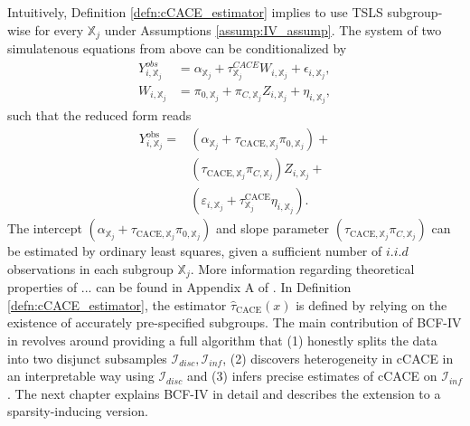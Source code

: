 Intuitively, Definition \ref{defn:cCACE_estimator} implies to use TSLS subgroup-wise for every $\mathbb{X}_j$ under Assumptions \ref{assump:IV_assump}. The system of two simulatenous equations from above can be conditionalized by 
\begin{align*}
   Y_{i, \mathbb{X}_j}^{obs} &= \alpha_{\mathbb{X}_j} + \tau_{\mathbb{X}_j}^{CACE} W_{i, \mathbb{X}_j} + \epsilon_{i, \mathbb{X}_j}, \\
   W_{i, \mathbb{X}_j} &= \pi_{0, \mathbb{X}_j} + \pi_{C, \mathbb{X}_j} Z_{i, \mathbb{X}_j} + \eta_{i, \mathbb{X}_j},
\end{align*}
such that the reduced form reads 
\begin{align*}
   Y_{i,\mathbb{X}_j}^{\text{obs}} = &\left( \alpha_{\mathbb{X}_j} +
    \tau_{\text{CACE},\mathbb{X}_j} \pi_{0,\mathbb{X}_j} \right) + \\
     &\left( \tau_{\text{CACE},\mathbb{X}_j} \pi_{C,\mathbb{X}_j} \right) Z_{i,\mathbb{X}_j} + \\
     &\left( \varepsilon_{i,\mathbb{X}_j} + \tau^{\text{CACE}}_{\mathbb{X}_j} \eta_{i,\mathbb{X}_j} \right).
\end{align*}
The intercept $\left( \alpha_{\mathbb{X}_j} + \tau_{\text{CACE},\mathbb{X}_j} \pi_{0,\mathbb{X}_j} \right)$ and slope parameter $\left( \tau_{\text{CACE},\mathbb{X}_j} \pi_{C,\mathbb{X}_j} \right)$ can be estimated by ordinary least squares, given a sufficient number of $i.i.d$ observations in each subgroup $\mathbb{X}_j$. More information regarding theoretical properties of ... can be found in Appendix A of \cite{bargagli-stoffi_heterogeneous_2022}. In Definition \ref{defn:cCACE_estimator}, the estimator $\widehat\tau_{\text{CACE}}(x)$ is defined by relying on the existence of accurately pre-specified subgroups. The main contribution of BCF-IV in \cite{bargagli-stoffi_heterogeneous_2022} revolves around providing a full algorithm that (1) honestly splits the data into two disjunct subsamples $\mathcal{I}_{disc}, \mathcal{I}_{inf}$, (2) discovers heterogeneity in cCACE in an interpretable way using $\mathcal{I}_{disc}$ and (3) infers precise estimates of cCACE on $\mathcal{I}_{inf}$. The next chapter explains BCF-IV in detail and describes the extension to a sparsity-inducing version.




